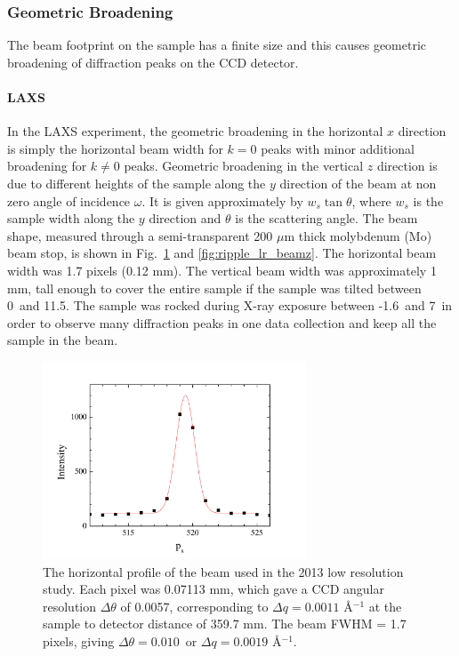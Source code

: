 \subsubsection{Geometric Broadening}\label{sec:geometric_broadening}
The beam footprint on the sample has a finite size and this causes
geometric broadening of diffraction peaks on the CCD detector.

\paragraph{LAXS}
In the LAXS experiment, 
the geometric broadening in the horizontal $x$ direction is simply the 
horizontal beam width for $k=0$ peaks with minor additional broadening
for $k\neq 0$ peaks. Geometric broadening in the vertical $z$ direction
is due to different heights of the sample along the $y$ direction of the beam 
at non zero angle of incidence $\omega$. It is given approximately by
$w_s\tan\theta$, where $w_s$ is the sample width along the $y$
direction and $\theta$ is the scattering angle.
The beam shape, measured through a semi-transparent 200 $\mu$m thick
molybdenum (Mo) beam stop, is shown in Fig.~\ref{fig:ripple_lr_beamx}
and \ref{fig:ripple_lr_beamz}.
The horizontal beam width was 1.7 pixels (0.12 mm). The vertical beam
width was approximately 1 mm, tall enough to cover the entire sample
if the sample was tilted between 0\textdegree\ and 11.5\textdegree. 
The sample was rocked
during X-ray exposure between -1.6\textdegree\ and 7\textdegree\ 
in order to observe many diffraction peaks in one data collection
and keep all the sample in the beam. 

\begin{figure}[p]
  \centering
  \includegraphics[width=0.7\textwidth]{figures/ripple/MMs/laxs/beamx_lr}
  \caption{The horizontal profile of the beam used in the 2013 low resolution study.
  Each pixel was 0.07113 mm, which gave a CCD angular resolution $\Delta\theta$ of 
  0.0057\textdegree, corresponding to $\Delta q=0.0011$ \AA$^{-1}$ at the 
  sample to detector distance of 359.7 mm. 
  The beam FWHM = 1.7 pixels, giving $\Delta\theta = 0.010$\textdegree\ or
  $\Delta q= 0.0019$ \AA$^{-1}$.}
  \label{fig:ripple_lr_beamx}
\end{figure}

